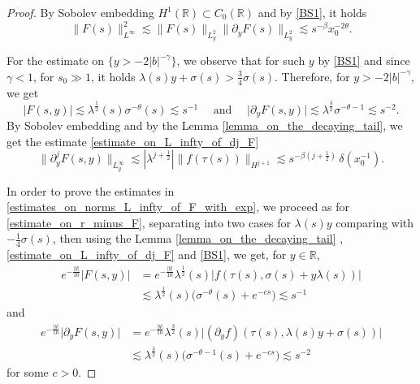 \documentclass[16pt,english, oneside,reqno]{smfart}
\newcommand{\RR}{\mathbb{R}}
\begin{document}
\begin{proof}
\vspace{0.4cm}

By Sobolev embedding $H^{1}(\RR) \subset C_0(\RR)$ and by \eqref{BS1}, it holds
\begin{equation}
    \|F(s)\|^2_{L^{\infty}} \lesssim \|F(s)\|_{L^2_y}\|\partial_y F(s) \|_{L^2_y} \lesssim s^{-\beta}x^{-2\theta}_0.
\end{equation}

For the estimate on $\{y>-2|b|^{-\gamma}\}$, we observe that for such $y$ by \eqref{BS1} and since $\gamma<1$, for $s_0 \gg 1$, it holds $\lambda(s)y+\sigma(s)> \frac{3}{4}\sigma(s)$.
Therefore, for $y>-2|b|^{-\gamma}$, we get
\begin{equation}
    \lvert F(s,y) \rvert \lesssim \lambda^{\frac{1}{2}}(s)\sigma^{-\theta}(s) \lesssim s^{-1} \quad \text{  and  }\quad \lvert \partial_y F(s,y) \rvert \lesssim \lambda^{\frac{3}{2}}\sigma^{-\theta-1} \lesssim s^{-2}.
\end{equation}
By Sobolev embedding and by the Lemma \ref{lemma_on_the_decaying_tail}, we get the estimate \eqref{estimate_on_L_infty_of_dj_F} 
\begin{equation}
    \| \partial^j_y F(s,y) \|_{L^{\infty}_y}  \lesssim |\lambda^{j + \frac{1}{2}}|\|f(\tau(s))\|_{H^{j+1}} \lesssim s^{-\beta(j+\frac{1}{2})} \,\delta(x^{-1}_0).
\end{equation}


In order to prove the estimates in \eqref{estimates_on_norms_L_infty_of_F_with_exp}, we proceed as for \eqref{estimate_on_r_minus_F}, separating into two cases for $\lambda(s)y$ comparing with $-\frac{1}{4}\sigma(s)$, then using the Lemma \ref{lemma_on_the_decaying_tail} , \eqref{estimate_on_L_infty_of_dj_F} and \eqref{BS1}, we get, for $y \in \RR$,
\begin{equation}
\begin{split}
    e^{-\frac{|y|}{10}}\lvert F(s,y) \rvert 
    & = e^{-\frac{|y|}{10}}\lambda^{\frac{1}{2}}(s)\lvert f(\tau(s),\sigma(s)+y\lambda(s)) \rvert \\
    & \lesssim \lambda^{\frac{1}{2}}(s)\big( \sigma^{-\theta}(s)+ e^{-cs} \big) \lesssim s^{-1}
\end{split}
\end{equation}
and
\begin{equation}
\begin{split}
    e^{-\frac{|y|}{10}}\lvert \partial_y F(s,y) \rvert 
    & = e^{-\frac{|y|}{10}}\lambda^{\frac{3}{2}}(s)\lvert (\partial_y f)(\tau(s),\lambda(s)y+\sigma(s)) \rvert \\
    & \lesssim \lambda^{\frac{3}{2}}(s)\big( \sigma^{-\theta-1}(s)+ e^{-cs} \big) \lesssim s^{-2}
\end{split}
\end{equation}
for some $c>0$.



\end{proof}
\end{document}
